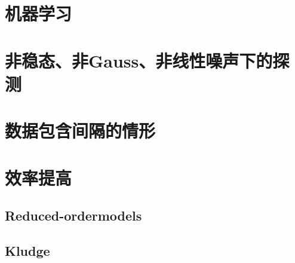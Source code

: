 \section{机器学习}

\section{非稳态、非Gauss、非线性噪声下的探测}

\section{数据包含间隔的情形}

\section{效率提高}
\subsection{Reduced-ordermodels}
\subsection{Kludge}

